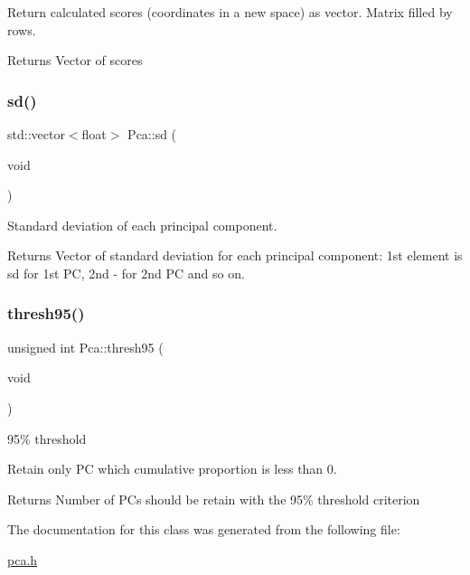 Return calculated scores (coordinates in a new space) as vector. Matrix filled by rows. \begin{DoxyReturn}{Returns}
Vector of scores 
\end{DoxyReturn}
\hypertarget{classPca_a687a02cd667152bc5ce9de328519799b}{}\label{classPca_a687a02cd667152bc5ce9de328519799b} 
\subsubsection{\texorpdfstring{sd()}{sd()}}
{\footnotesize\ttfamily std\+::vector$<$float$>$ Pca\+::sd (\begin{DoxyParamCaption}\item[{void}]{ }\end{DoxyParamCaption})}



Standard deviation of each principal component. 

\begin{DoxyReturn}{Returns}
Vector of standard deviation for each principal component\+: 1st element is sd for 1st PC, 2nd -\/ for 2nd PC and so on. 
\end{DoxyReturn}
\hypertarget{classPca_a0ff511b4a419122a8ac6db494289ae2a}{}\label{classPca_a0ff511b4a419122a8ac6db494289ae2a} 
\subsubsection{\texorpdfstring{thresh95()}{thresh95()}}
{\footnotesize\ttfamily unsigned int Pca\+::thresh95 (\begin{DoxyParamCaption}\item[{void}]{ }\end{DoxyParamCaption})}



95\% threshold 

Retain only PC which cumulative proportion is less than 0. \begin{DoxyReturn}{Returns}
Number of P\+Cs should be retain with the 95\% threshold criterion 
\end{DoxyReturn}


The documentation for this class was generated from the following file\+:\begin{DoxyCompactItemize}
\item 
\hyperlink{pca_8h}{pca.\+h}\end{DoxyCompactItemize}

